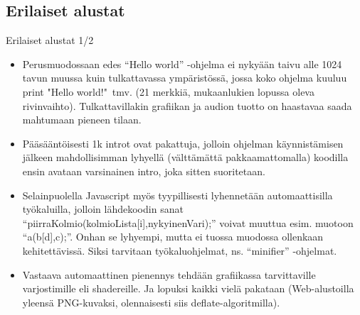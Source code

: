 \documentclass[pdf,10pt,handout]{beamer}
\begin{document}
\subsection{Erilaiset alustat}
\begin{frame}{Erilaiset alustat 1/2}
  \begin{itemize}
    \item Perusmuodossaan edes ``Hello world'' -ohjelma ei nykyään
      taivu alle 1024 tavun muussa kuin tulkattavassa ympäristössä,
      jossa koko ohjelma kuuluu print "Hello world!"\ tmv. (21
      merkkiä, mukaanlukien lopussa oleva
      rivinvaihto). Tulkattavillakin grafiikan ja audion tuotto on
      haastavaa saada mahtumaan pieneen tilaan.
    \item Pääsääntöisesti 1k introt ovat pakattuja, jolloin ohjelman
      käynnistämisen jälkeen mahdollisimman lyhyellä (välttämättä
      pakkaamattomalla) koodilla ensin avataan varsinainen intro, joka
      sitten suoritetaan.
    \item Selainpuolella Javascript myös tyypillisesti lyhennetään
      automaattisilla työkaluilla, jolloin lähdekoodin sanat
      ``piirraKolmio(kolmioLista[i],nykyinenVari);'' voivat muuttua
      esim. muotoon ``a(b[d],c);''. Onhan se lyhyempi, mutta ei tuossa
      muodossa ollenkaan kehitettävissä. Siksi tarvitaan
      työkaluohjelmat, ns. ``minifier'' -ohjelmat.
    \item Vastaava automaattinen pienennys tehdään grafiikassa
      tarvittaville varjostimille eli shadereille. Ja lopuksi kaikki
      vielä pakataan (Web-alustoilla yleensä PNG-kuvaksi, olennaisesti
      siis deflate-algoritmilla).
  \end{itemize}
\end{frame}
\end{document}
